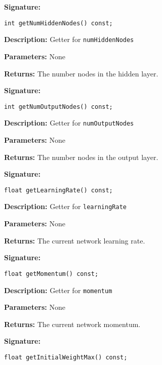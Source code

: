 \documentclass[a4paper]{article}
\begin{document}
\hrulefill %

\textbf{Signature:} \begin{lstlisting}
int getNumHiddenNodes() const;
\end{lstlisting}

\textbf{Description: }
Getter for \lstinline{numHiddenNodes}

\textbf{Parameters: } None

\textbf{Returns: }
The number nodes in the hidden layer.

\hrulefill %

\textbf{Signature:} \begin{lstlisting}
int getNumOutputNodes() const;
\end{lstlisting}

\textbf{Description: }
Getter for \lstinline{numOutputNodes}

\textbf{Parameters: } None

\textbf{Returns: }
The number nodes in the output layer.

\hrulefill %

\textbf{Signature:} \begin{lstlisting}
float getLearningRate() const;
\end{lstlisting}

\textbf{Description: }
Getter for \lstinline{learningRate}

\textbf{Parameters: } None

\textbf{Returns: }
The current network learning rate.

\hrulefill %

\textbf{Signature:} \begin{lstlisting}
float getMomentum() const;
\end{lstlisting}

\textbf{Description: }
Getter for \lstinline{momentum}

\textbf{Parameters: } None

\textbf{Returns: }
The current network momentum.

\hrulefill %

\textbf{Signature:} \begin{lstlisting}
float getInitialWeightMax() const;
\end{lstlisting}
\end{document}
